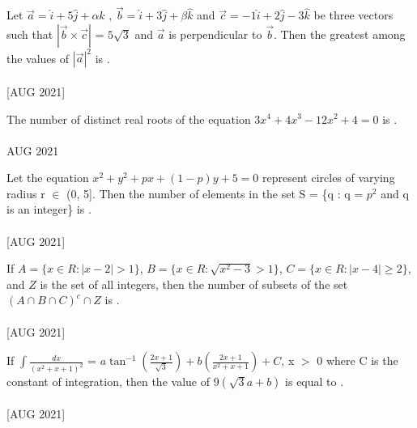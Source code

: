 \iffalse
  \title{Assignment}
  \author{ee24btech11030}
  \section{mcq-single}
\fi

\item Let $\overset{\rightarrow}{a} = \hat{i} + 5\hat{j} + \alpha \hat{k}$ , $\overset{\rightarrow}{b} = \hat{i} + 3\hat{j} + \beta \hat{k}$ and $\overset{\rightarrow}{c} = -1\hat{i} + 2\hat{j} - 3\hat{k}$ be three vectors such that $|\overset{\rightarrow}{b} \times \overset{\rightarrow}{c}|$ = $5\sqrt{3}$ and
    $\overset{\rightarrow}{a}$ is perpendicular to $\overset{\rightarrow}{b}$. Then the greatest among the values of ${|\overset{\rightarrow}{a}|}^2$ is \underline{\hspace{1cm}}.\\\\\hfill{[AUG 2021]}
    \item The number of distinct real roots of the equation $3x^4 + 4x^3 - 12x^2 + 4 = 0$ is  \underline{\hspace{1cm}}. \\\\\hfill{AUG 2021}
    \item Let the equation $x^2 + y^2 + px + (1 - p)y + 5 = 0$ represent circles of varying radius r $\in$ (0, 5]. Then the number of elements in the set S = \{q : q = $p^2$ and q is an integer\} is \underline{\hspace{1cm}}. \\\\\hfill{[AUG 2021]}
    \item If $A = \{ x \in R : |x - 2| > 1 \}$, $B = \{ x \in R : \sqrt{x^2 - 3} > 1 \}$, $C = \{ x \in  R : |x - 4| \geq 2 \}$, and $Z$ is the set of all integers, then the number of subsets of the set $(A \cap B \cap C)^{c} \cap Z$ is \underline{\hspace{1cm}}. \\\\\hfill{[AUG 2021]}
    \item If $\int\frac{dx}{(x^2 + x +1)^{2}}$ = $a\tan^{-1}{\left(\frac{2x + 1}{\sqrt{3}}\right)} + b\left(\frac{2x + 1}{x^2 + x + 1}\right) + C$, x $>$ 0 where C is the constant of integration, then the value of $9(\sqrt{3}a + b)$ is equal to \underline{\hspace{1cm}}.\\\\\hfill{[AUG 2021]}
